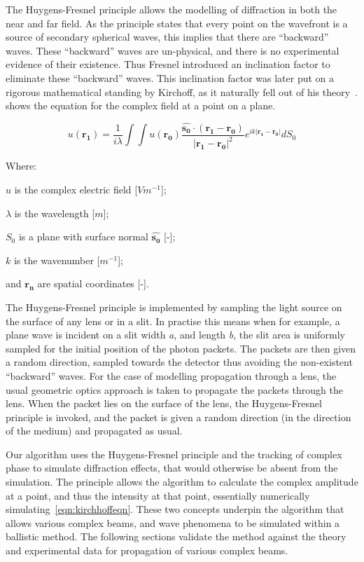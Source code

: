 The Huygens-Fresnel principle allows the modelling of diffraction in both the near and far field.
As the principle states that every point on the wavefront is a source of secondary spherical waves, this implies that there are ``backward'' waves.
These ``backward'' waves are un-physical, and there is no experimental evidence of their existence.
Thus Fresnel introduced an inclination factor to eliminate these ``backward'' waves.
This inclination factor was later put on a rigorous mathematical standing by Kirchoff, as it naturally fell out of his theory~\cite{kirchhoff1883ann,born2000principles}.
 shows the equation for the complex field at a point on a plane.

\begin{equation}
u(\mathbf{r_1})=\frac{1}{i\lambda}\int\int u(\mathbf{r_0})\frac{\mathbf{\hat{s_0}} \cdot (\mathbf{r_1} - \mathbf{r_0})}{\left|\mathbf{r_1} - \mathbf{r_0}\right|^2}e^{ik\left|\mathbf{r_1} - \mathbf{r_0}\right|}dS_0
\label{eqn:kirchhoffeqn}
\end{equation}

\noindent Where:

    \indent $u$ is the complex electric field [$Vm^{-1}$];

    \indent $\lambda$ is the wavelength [$m$];

    \indent $S_0$ is a plane with surface normal $\mathbf{\hat{s_0}}$ [-];

    \indent $k$ is the wavenumber [$m^{-1}$];

    \indent and $\mathbf{r_n}$ are spatial coordinates [-]. 

\medskip

The Huygens-Fresnel principle is implemented by sampling the light source on the surface of any lens or in a slit.
In practise this means when for example, a plane wave is incident on a slit width \textit{a}, and length \textit{b}, the slit area is uniformly sampled for the initial position of the photon packets.
The packets are then given a random direction, sampled towards the detector thus avoiding the non-existent ``backward'' waves.
For the case of modelling propagation through a lens, the usual geometric optics approach is taken to propagate the packets through the lens.
When the packet lies on the surface of the lens, the Huygens-Fresnel principle is invoked, and the packet is given a random direction (in the direction of the medium) and propagated as usual.

\medskip

Our algorithm uses the Huygens-Fresnel principle and the tracking of complex phase to simulate diffraction effects, that would otherwise be absent from the simulation.
The principle allows the algorithm to calculate the complex amplitude at a point, and thus the intensity at that point, essentially numerically simulating~\cref{eqn:kirchhoffeqn}.
These two concepts underpin the algorithm that allows various complex beams, and wave phenomena to be simulated within a ballistic method. The following sections validate the method against the theory and experimental data for propagation of various complex beams.

